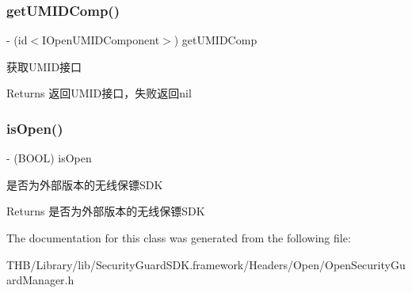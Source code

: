 \subsubsection{\texorpdfstring{get\+U\+M\+I\+D\+Comp()}{getUMIDComp()}}
{\footnotesize\ttfamily -\/ (id$<$I\+Open\+U\+M\+I\+D\+Component$>$) get\+U\+M\+I\+D\+Comp \begin{DoxyParamCaption}{ }\end{DoxyParamCaption}}

获取\+U\+M\+I\+D接口

\begin{DoxyReturn}{Returns}
返回\+U\+M\+I\+D接口，失败返回nil 
\end{DoxyReturn}
\mbox{\label{interface_open_security_guard_manager_a705c64d9df8f02624a2924b03adf5936}} 
\subsubsection{\texorpdfstring{is\+Open()}{isOpen()}}
{\footnotesize\ttfamily -\/ (B\+O\+OL) is\+Open \begin{DoxyParamCaption}{ }\end{DoxyParamCaption}}

是否为外部版本的无线保镖\+S\+DK

\begin{DoxyReturn}{Returns}
是否为外部版本的无线保镖\+S\+DK 
\end{DoxyReturn}


The documentation for this class was generated from the following file\+:\begin{DoxyCompactItemize}
\item 
T\+H\+B/\+Library/lib/\+Security\+Guard\+S\+D\+K.\+framework/\+Headers/\+Open/Open\+Security\+Guard\+Manager.\+h\end{DoxyCompactItemize}
